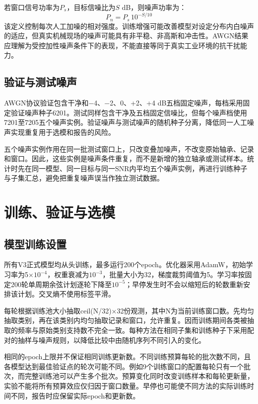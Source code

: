 \documentclass[UTF8,12pt,openany,twoside]{ctexbook}
\numberwithin{equation}{chapter}
\begin{document}
若窗口信号功率为$P_s$，目标信噪比为$S$ dB，则噪声功率为：
\begin{equation}
\label{eq:auto14}
P_n=P_s\,10^{-S/10}
\end{equation}该定义控制每次人工加噪的相对强度。训练增强可能改善模型对设定分布内白噪声的适应，但真实机械现场的噪声可能具有非平稳、非高斯和冲击性。AWGN结果应理解为受控加性噪声条件下的表现，不能直接等同于真实工业环境的抗干扰能力。

\subsection{验证与测试噪声}\label{ux9a8cux8bc1ux4e0eux6d4bux8bd5ux566aux58f0}

AWGN协议验证包含干净和−4、−2、0、+2、+4 dB五档固定噪声，每档采用固定验证噪声种子6201。测试同样包含干净及五档固定信噪比，但每个噪声档使用7201至7205五个噪声实例。验证噪声与测试噪声的随机种子分离，降低同一人工噪声实现重复用于选模和报告的风险。

五个噪声实例作用在同一批测试窗口上，只改变叠加噪声，不改变原始轴承、记录和窗口。因此，这些实例是噪声条件重复，而不是新增的独立轴承或测试样本。统计时先在同一模型、同一目标与同一SNR内平均五个噪声实例，再进行训练种子与子集汇总，避免把重复噪声误当作独立测试数据。

\section{训练、验证与选模}\label{ux8badux7ec3ux9a8cux8bc1ux4e0eux9009ux6a21}

\subsection{模型训练设置}\label{ux6a21ux578bux8badux7ec3ux8bbeux7f6e}

所有V3正式模型均从头训练，最多运行200个epoch。优化器采用AdamW，初始学习率为5×$10^{-4}$，权重衰减为$10^{-3}$，批量大小为32，梯度裁剪阈值为5。学习率按固定200轮单周期余弦计划逐轮下降至$10^{-5}$；早停发生时不会以缩短后的轮数重新安排该计划。交叉熵不使用标签平滑。

每轮根据训练池大小抽取ceil(N/32)×32份观测，其中N为当前训练窗口数。先均匀抽取类别，再在该类别内均匀抽取记录和窗口，允许重复。因而训练期间各类被抽取的频率与原始类别支持数不完全一致。每种方法在相同子集和训练种子下采用配对的抽样与噪声规则，以降低比较中由随机序列不同引入的变化。

相同的epoch上限并不保证相同训练更新数。不同训练预算每轮的批次数不同，且各模型达到最佳验证点的轮次可能不同。例如9个训练窗口的配置每轮只有一个批次，而完整训练池可以产生多个批次。预算变化同时改变训练样本和每轮更新量，实验不能将所有预算效应仅归因于窗口数量。早停也可能使不同方法的实际训练时间不同，报告时应保留实际epoch和更新数。
\end{document}
